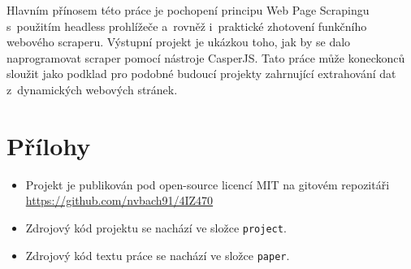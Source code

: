 \documentclass[11pt,a4paper]{article}
\begin{document}
Hlavním přínosem této práce je pochopení principu Web Page Scrapingu s~použitím headless prohlížeče a~rovněž i~praktické zhotovení funkčního webového scraperu. Výstupní projekt je ukázkou toho, jak by se dalo naprogramovat scraper pomocí nástroje CasperJS. Tato práce může koneckonců sloužit jako podklad pro podobné budoucí projekty zahrnující extrahování dat z~dynamických webových stránek.

\newpage






\section*{Přílohy}
\begin{itemize}
\item Projekt je publikován pod open-source licencí MIT na gitovém repozitáři \\ \url{https://github.com/nvbach91/4IZ470} 
\item Zdrojový kód projektu se nachází ve složce \texttt{project}.
\item Zdrojový kód textu práce se nachází ve složce \texttt{paper}.
\end{itemize}
\end{document}
